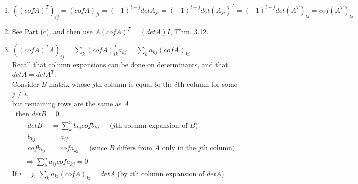 \documentclass[twoside]{amsart}
\theoremstyle{plain}
\theoremstyle{definition}
\newcommand{\exercisehead}[1]
  {
   \noindent{\small\bf Exercise #1.}
   \smallskip}
\begin{document}
\exercisehead{4} 
\begin{enumerate}
\item $((cof{A})^T)_{ij} = (cof{A})_{ji} = (-1)^{i+j} det{A_{ji}} = (-1)^{i+j}det{(A_{ji})^T} = (-1)^{i+j} det{(A^T)_{ij}} = cof{(A^T)_{ij}}$
\item See Part (c), and then use $A(cof{A})^T = (det{A})I$, Thm. 3.12.  
\item $((cof{A})^T A)_{ij} = \sum_k (cof{A})^T_{ik} a_{kj} = \sum_k a_{kj} (cof{A})_{ki}$ \smallskip \\
Recall that column expansions can be done on determinants, and that $det{A} = det{A^T}$.  \\

Consider $B$ matrix whose $j$th column is equal to the $i$th column for some $j\neq i$, \\
\quad but remaining rows are the same as $A$.  \\
\quad \, then $det{B} =0$ 
\[
\begin{gathered}
\begin{aligned}
  det{B} & = \sum_{k}^n b_{kj} cof{b_{kj}} \quad \, \text{ ($j$th column expansion of $B$) } \\
  b_{kj} & = a_{ij} \\ 
  cof{b_{kj}} & = cof{a_{kj}} \quad \, \text{ (since $B$ differs from $A$ only in the $j$th column) }
\end{aligned} \\
\Longrightarrow \sum_k^n a_{ij} cof{a_{kj}} = 0 
\end{gathered}
\]
If $i=j$, $\sum_k a_{ki} (cof{A})_{ki} = det{A}$ (by $i$th column expansion of $det{A}$)
\end{enumerate}
\end{document}
